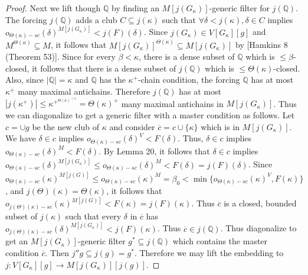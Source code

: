 \documentclass[10pt,leqno]{amsart}
\begin{document}
\begin{proof}
 Next we lift though $\mathbb{Q}$ by finding an $M[j(G_{\kappa})]$-generic filter for $j(\mathbb{Q})$. The forcing $j(\mathbb{Q})$ adds a club $C \subseteq j(\kappa)$ such that $\forall \delta < j(\kappa), \delta \in C$ implies $o_{\Theta(\kappa)-sc}(\delta)^{M[j(G_{\kappa})]} <j(F)(\delta)$. Since $j(G_{\kappa}) \in V[G_{\kappa}][g]$ and $M^{\Theta(\kappa)} \subseteq M$, it follows that $M[j(G_{\kappa})]^{\Theta(\kappa)} \subseteq M[j(G_{\kappa})]$ by [Hamkins 8 (Theorem 53)]. Since for every $\beta < \kappa$, there is a dense subset of $\mathbb{Q}$ which is $\le \beta$-closed, it follows that there is a dense subset of $j(\mathbb{Q})$ which is $\le \Theta(\kappa)$-closed. Also, since $|\mathbb{Q}| = \kappa$ and $\mathbb{Q}$ has the $\kappa^+$-chain condition, the forcing $\mathbb{Q}$ has at most $\kappa^+$ many maximal antichains. Therefore $j(\mathbb{Q})$ has at most $|j(\kappa^+)| \le \kappa^{+^{\Theta(\kappa)^{<\kappa}}} = \Theta(\kappa)^+$ many maximal antichains in $M[j(G_{\kappa})]$. Thus we can diagonalize to get a generic filter with a master condition as follows. Let $c = \cup g$ be the new club of $\kappa$ and consider $\overline{c} = c \cup \{ \kappa \}$ which is in $M[j(G_{\kappa})]$. We have $\delta \in c$ implies $o_{\Theta(\kappa)-sc}(\delta)^V < F(\delta)$. Thus, $\delta \in c$ implies $o_{\Theta(\kappa)-sc}(\delta)^M < F(\delta)$. By Lemma 20, it follows that $\delta \in c$ implies $o_{\Theta(\kappa)-sc}(\delta)^{M[j(G_{\kappa})]} \le o_{\Theta(\kappa)-sc}(\delta)^M < F(\delta) = j(F)(\delta)$. Since $o_{\Theta(\kappa)-sc}(\kappa)^{M[j(G)]} \le o_{\Theta(\kappa)-sc}(\kappa)^M = \beta_0 < \min\{o_{\Theta(\kappa)-sc}(\kappa)^V, F(\kappa)\}$, and $j(\Theta)(\kappa) = \Theta(\kappa)$, it follows that $o_{j(\Theta)(\kappa)-sc}(\kappa)^{M[j(G)]} < F(\kappa) = j(F)(\kappa)$. Thus $\overline{c}$ is a closed, bounded subset of $j(\kappa)$ such that every $\delta$ in $\overline{c}$ has $o_{j(\Theta)(\kappa)-sc}(\delta)^{M[j(G_{\kappa})]} < j(F)(\kappa)$. Thus $\overline{c} \in j(\mathbb{Q})$. Thus diagonalize to get an $M[j(G_{\kappa})]$-generic filter $g^* \subseteq j(\mathbb{Q})$ which contains the master condition $\overline{c}$. Then $j''g \subseteq j(g) = g^*$. Therefore we may lift the embedding to $j:V[G_{\kappa}][g] \to M[j(G_{\kappa})][j(g)]$.


\end{proof}
\end{document}
